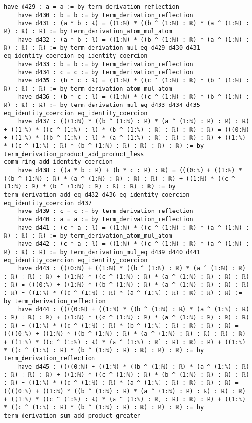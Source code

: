 \documentclass{article}
\begin{document}
\begin{tcolorbox}[colback=white!10, width=\linewidth]
\begin{lstlisting}[language=Lean4]
    have d429 : a = a := by term_derivation_reflection
    have d430 : b = b := by term_derivation_reflection
    have d431 : (a * b : ℝ) = ((1:ℕ) * ((b ^ (1:ℕ) : ℝ) * (a ^ (1:ℕ) : ℝ) : ℝ) : ℝ) := by term_derivation_atom_mul_atom
    have d432 : (a * b : ℝ) = ((1:ℕ) * ((b ^ (1:ℕ) : ℝ) * (a ^ (1:ℕ) : ℝ) : ℝ) : ℝ) := by term_derivation_mul_eq d429 d430 d431 eq_identity_coercion eq_identity_coercion
    have d433 : b = b := by term_derivation_reflection
    have d434 : c = c := by term_derivation_reflection
    have d435 : (b * c : ℝ) = ((1:ℕ) * ((c ^ (1:ℕ) : ℝ) * (b ^ (1:ℕ) : ℝ) : ℝ) : ℝ) := by term_derivation_atom_mul_atom
    have d436 : (b * c : ℝ) = ((1:ℕ) * ((c ^ (1:ℕ) : ℝ) * (b ^ (1:ℕ) : ℝ) : ℝ) : ℝ) := by term_derivation_mul_eq d433 d434 d435 eq_identity_coercion eq_identity_coercion
    have d437 : (((1:ℕ) * ((b ^ (1:ℕ) : ℝ) * (a ^ (1:ℕ) : ℝ) : ℝ) : ℝ) + ((1:ℕ) * ((c ^ (1:ℕ) : ℝ) * (b ^ (1:ℕ) : ℝ) : ℝ) : ℝ) : ℝ) = (((0:ℕ) + ((1:ℕ) * ((b ^ (1:ℕ) : ℝ) * (a ^ (1:ℕ) : ℝ) : ℝ) : ℝ) : ℝ) + ((1:ℕ) * ((c ^ (1:ℕ) : ℝ) * (b ^ (1:ℕ) : ℝ) : ℝ) : ℝ) : ℝ) := by term_derivation_product_add_product_less comm_ring_add_identity_coercion
    have d438 : ((a * b : ℝ) + (b * c : ℝ) : ℝ) = (((0:ℕ) + ((1:ℕ) * ((b ^ (1:ℕ) : ℝ) * (a ^ (1:ℕ) : ℝ) : ℝ) : ℝ) : ℝ) + ((1:ℕ) * ((c ^ (1:ℕ) : ℝ) * (b ^ (1:ℕ) : ℝ) : ℝ) : ℝ) : ℝ) := by term_derivation_add_eq d432 d436 eq_identity_coercion eq_identity_coercion d437
    have d439 : c = c := by term_derivation_reflection
    have d440 : a = a := by term_derivation_reflection
    have d441 : (c * a : ℝ) = ((1:ℕ) * ((c ^ (1:ℕ) : ℝ) * (a ^ (1:ℕ) : ℝ) : ℝ) : ℝ) := by term_derivation_atom_mul_atom
    have d442 : (c * a : ℝ) = ((1:ℕ) * ((c ^ (1:ℕ) : ℝ) * (a ^ (1:ℕ) : ℝ) : ℝ) : ℝ) := by term_derivation_mul_eq d439 d440 d441 eq_identity_coercion eq_identity_coercion
    have d443 : (((0:ℕ) + ((1:ℕ) * ((b ^ (1:ℕ) : ℝ) * (a ^ (1:ℕ) : ℝ) : ℝ) : ℝ) : ℝ) + ((1:ℕ) * ((c ^ (1:ℕ) : ℝ) * (a ^ (1:ℕ) : ℝ) : ℝ) : ℝ) : ℝ) = (((0:ℕ) + ((1:ℕ) * ((b ^ (1:ℕ) : ℝ) * (a ^ (1:ℕ) : ℝ) : ℝ) : ℝ) : ℝ) + ((1:ℕ) * ((c ^ (1:ℕ) : ℝ) * (a ^ (1:ℕ) : ℝ) : ℝ) : ℝ) : ℝ) := by term_derivation_reflection
    have d444 : ((((0:ℕ) + ((1:ℕ) * ((b ^ (1:ℕ) : ℝ) * (a ^ (1:ℕ) : ℝ) : ℝ) : ℝ) : ℝ) + ((1:ℕ) * ((c ^ (1:ℕ) : ℝ) * (a ^ (1:ℕ) : ℝ) : ℝ) : ℝ) : ℝ) + ((1:ℕ) * ((c ^ (1:ℕ) : ℝ) * (b ^ (1:ℕ) : ℝ) : ℝ) : ℝ) : ℝ) = ((((0:ℕ) + ((1:ℕ) * ((b ^ (1:ℕ) : ℝ) * (a ^ (1:ℕ) : ℝ) : ℝ) : ℝ) : ℝ) + ((1:ℕ) * ((c ^ (1:ℕ) : ℝ) * (a ^ (1:ℕ) : ℝ) : ℝ) : ℝ) : ℝ) + ((1:ℕ) * ((c ^ (1:ℕ) : ℝ) * (b ^ (1:ℕ) : ℝ) : ℝ) : ℝ) : ℝ) := by term_derivation_reflection
    have d445 : ((((0:ℕ) + ((1:ℕ) * ((b ^ (1:ℕ) : ℝ) * (a ^ (1:ℕ) : ℝ) : ℝ) : ℝ) : ℝ) + ((1:ℕ) * ((c ^ (1:ℕ) : ℝ) * (b ^ (1:ℕ) : ℝ) : ℝ) : ℝ) : ℝ) + ((1:ℕ) * ((c ^ (1:ℕ) : ℝ) * (a ^ (1:ℕ) : ℝ) : ℝ) : ℝ) : ℝ) = ((((0:ℕ) + ((1:ℕ) * ((b ^ (1:ℕ) : ℝ) * (a ^ (1:ℕ) : ℝ) : ℝ) : ℝ) : ℝ) + ((1:ℕ) * ((c ^ (1:ℕ) : ℝ) * (a ^ (1:ℕ) : ℝ) : ℝ) : ℝ) : ℝ) + ((1:ℕ) * ((c ^ (1:ℕ) : ℝ) * (b ^ (1:ℕ) : ℝ) : ℝ) : ℝ) : ℝ) := by term_derivation_sum_add_product_greater

\end{lstlisting}
\end{tcolorbox}
\end{document}

